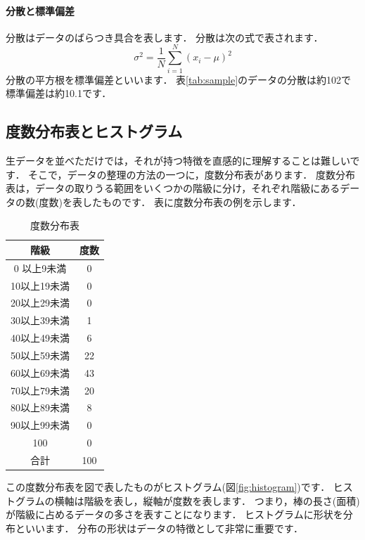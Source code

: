 \documentclass[12pt, a4j]{jsreport}
\begin{document}
\paragraph{分散と標準偏差}
分散はデータのばらつき具合を表します．
分散は次の式で表されます．
\begin{equation}
    \sigma^2 = \frac{1}{N} \sum_{i=1}^{N} (x_i - \mu)^2
\end{equation}
分散の平方根を標準偏差といいます．
表\ref{tab:sample}のデータの分散は約102で標準偏差は約10.1です．

\subsection{度数分布表とヒストグラム}

生データを並べただけでは，それが持つ特徴を直感的に理解することは難しいです．
そこで，データの整理の方法の一つに，度数分布表があります．
度数分布表は，データの取りうる範囲をいくつかの階級に分け，それぞれ階級にあるデータの数(度数)を表したものです．
表に度数分布表の例を示します．

\begin{table}[tb]
    \centering
    \caption{度数分布表}
    \begin{tabular}{c|c}
     階級          & 度数 \\ \hline
     0 以上9未満   & 0 \\
     10以上19未満  & 0 \\
     20以上29未満  & 0 \\
     30以上39未満  & 1 \\
     40以上49未満  & 6 \\
     50以上59未満  & 22\\
     60以上69未満  & 43\\
     70以上79未満  & 20\\
     80以上89未満  & 8 \\
     90以上99未満  & 0 \\
     100           & 0 \\
     合計          & 100
    \end{tabular}
    \label{tab:hist}
\end{table}

この度数分布表を図で表したものがヒストグラム(図\ref{fig:histogram})です．
ヒストグラムの横軸は階級を表し，縦軸が度数を表します．
つまり，棒の長さ(面積)が階級に占めるデータの多さを表すことになります．
ヒストグラムに形状を分布といいます．
分布の形状はデータの特徴として非常に重要です．
\end{document}
